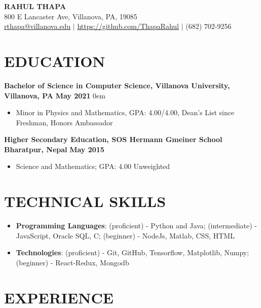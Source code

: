 \documentclass[letterpaper,11pt]{article}
\begin{document}
\begin{center}
    {\LARGE \textbf{RAHUL THAPA}}\\
800 E Lancaster Ave, Villanova, PA, 19085\\
  \href{mailto:rthapa@villanova.edu}{rthapa@villanova.edu} $\vert$ \href{https://github.com/ThapaRahul}{https://github.com/ThapaRahul} $\vert$ (682) 702-9256 \\
\end{center} 



\section{\textbf{EDUCATION}}
      \textbf{Bachelor of Science in Computer Science, Villanova University, Villanova, PA}
      \null\hfill {\textbf{May 2021}}
      \itemsep0em
      \begin{itemize}
      \itemsep0em
          \item \normalfont Minor in Physics and Mathematics, GPA: 4.00/4.00, Dean's List since Freshman, Honors Ambassador
      \end{itemize}
      {\textbf{Higher Secondary Education, SOS Hermann Gmeiner School Bharatpur, Nepal}}
      \null\hfill {\textbf{May 2015}}
      \begin{itemize}
      \itemsep0em
          \item {\normalfont Science and Mathematics;  GPA: 4.00 Unweighted}
      \end{itemize}
  
\section{\textbf{TECHNICAL SKILLS}}
    \begin{itemize}
    \itemsep0em
        \item 
            {\textbf{Programming Languages}: (proficient) - Python and Java; (intermediate) - JavaScript, Oracle SQL, C; (beginner) - NodeJs, Matlab, CSS, HTML}
        \item
            {\textbf{Technologies}: (proficient) - Git, GitHub, Tensorflow, Matplotlib, Numpy; (beginner) -  React-Redux, Mongodb}
    \end{itemize}


  
\section{\textbf{EXPERIENCE}}
            
\end{document}

